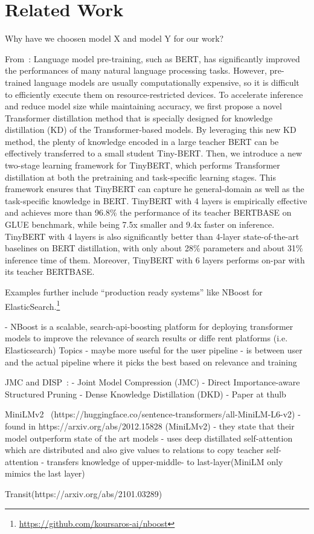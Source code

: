 \section{Related Work}

Why have we choosen model X and model Y for our work?

From~\cite{jiao20}: Language model pre-training, such as BERT, has significantly improved the performances of many natural language processing tasks. However, pre-trained language models are usually computationally expensive, so it is difficult to efficiently execute them on resource-restricted devices. To accelerate inference and reduce model size while maintaining accuracy, we first propose a novel Transformer distillation method that is specially designed for knowledge distillation (KD) of the Transformer-based models. By leveraging this new KD method, the plenty of knowledge encoded in a large teacher BERT can be effectively transferred to a small student Tiny-BERT. Then, we introduce a new two-stage learning framework for TinyBERT, which performs Transformer distillation at both the pretraining and task-specific learning stages. This framework ensures that TinyBERT can capture he general-domain as well as the task-specific knowledge in BERT.
TinyBERT with 4 layers is empirically effective and achieves more than 96.8\% the performance of its teacher BERTBASE on GLUE benchmark, while being 7.5x smaller and 9.4x faster on inference. TinyBERT with 4 layers is also significantly better than 4-layer state-of-the-art baselines on BERT distillation, with only about 28\% parameters and about 31\% inference time of them. Moreover, TinyBERT with 6 layers performs on-par with its teacher BERTBASE.



Examples further include ``production ready systems'' like NBoost for ElasticSearch.\footnote{\url{https://github.com/koursaros-ai/nboost}}


- NBoost is a scalable, search-api-boosting platform for deploying
transformer models to improve the relevance of search results or
diffe rent platforms (i.e. Elasticsearch) Topics
- maybe more useful for the user pipeline
- is between user and the actual pipeline where it picks the best
based on relevance and training

JMC and DISP~\cite{cui21}:
- Joint Model Compression (JMC)
- Direct Importance-aware Structured Pruning
- Dense Knowledge Distillation (DKD)
- Paper at thulb

MiniLMv2~\cite{wang21} (https://huggingface.co/sentence-transformers/all-MiniLM-L6-v2)
- found in https://arxiv.org/abs/2012.15828 (MiniLMv2)
- they state that their model outperform state of the art models
- uses deep distillated self-attention which are distributed and also
give values to relations to copy teacher self-attention
- transfers knowledge of upper-middle- to last-layer(MiniLM only
mimics the last layer)

Transit(https://arxiv.org/abs/2101.03289)

